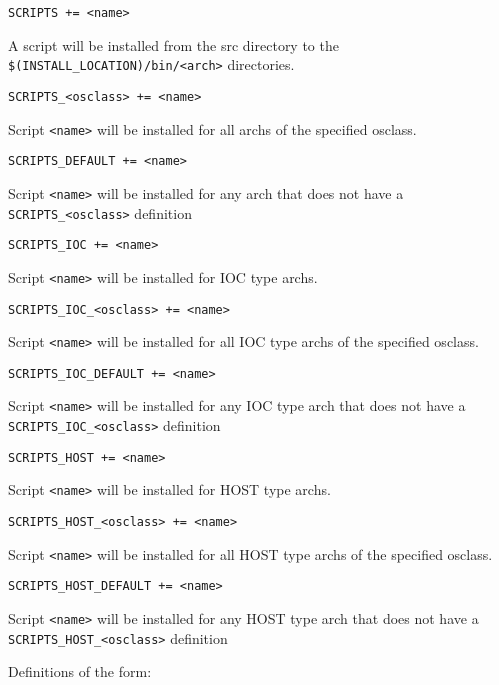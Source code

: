 \begin{description}

\item {}\verb|SCRIPTS += <name>|

A script will be installed from the src directory to the \verb|$(INSTALL_LOCATION)/bin/<arch>| directories.

\item \verb|SCRIPTS_<osclass> += <name>|

Script \verb|<name>| will be installed for all archs of the specified osclass.

\item \verb|SCRIPTS_DEFAULT += <name>|

Script \verb|<name>| will be installed for any arch that does not have a \verb|SCRIPTS_<osclass>| definition

\item {}\verb|SCRIPTS_IOC += <name>|

Script \verb|<name>| will be installed for IOC type archs.

\item \verb|SCRIPTS_IOC_<osclass> += <name>|

Script \verb|<name>| will be installed for all IOC type archs of the specified osclass.

\item \verb|SCRIPTS_IOC_DEFAULT += <name>|

Script \verb|<name>| will be installed for any IOC type arch that does not have a \verb|SCRIPTS_IOC_<osclass>| 
definition

\item {}\verb|SCRIPTS_HOST += <name>|

Script \verb|<name>| will be installed for HOST type archs.

\item \verb|SCRIPTS_HOST_<osclass> += <name>|

Script \verb|<name>| will be installed for all HOST type archs of the specified osclass.

\item \verb|SCRIPTS_HOST_DEFAULT += <name>|

Script \verb|<name>| will be installed for any HOST type arch that does not have a \verb|SCRIPTS_HOST_<osclass>| 
definition

\end{description}

Definitions of the form:

